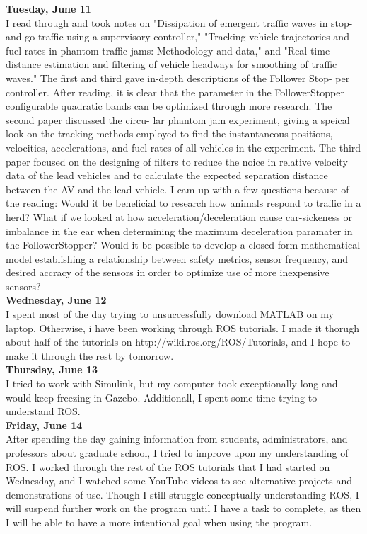 \documentclass[12pt, letterpaper]{article}
\begin{document}
{\bf Tuesday, June 11}\\
I read through and took notes on "Dissipation of emergent traffic waves in stop-and-go traffic using a supervisory controller," "Tracking vehicle trajectories and fuel rates in phantom traffic jams: Methodology and data," and 
"Real-time distance estimation and filtering of vehicle headways for smoothing of traffic waves." The first and third gave in-depth descriptions of the Follower Stop- per controller. After reading, it is clear that the parameter in the FollowerStopper configurable quadratic bands can be optimized through more research. The second paper discussed the circu- lar phantom jam experiment, giving a speical look on the tracking methods employed to find the instantaneous positions, velocities, accelerations, and fuel rates of all vehicles in the experiment. The third paper focused on the designing of filters to reduce the noice in relative velocity data of the lead vehicles and to calculate the expected separation distance between the AV and the lead vehicle. I cam up with a few questions because of the reading: Would it be beneficial to research how animals respond to traffic in a herd? What if we looked at how acceleration/deceleration cause car-sickeness or imbalance in the ear when determining the maximum deceleration paramater in the FollowerStopper? Would it be possible to develop a closed-form mathematical model establishing a relationship between safety metrics, sensor frequency, and desired accracy of the sensors in order to optimize use of more inexpensive sensors? \\
 
{\bf Wednesday, June 12}\\
I spent most of the day trying to unsuccessfully download MATLAB on my laptop. Otherwise, i have been working through ROS tutorials. I made it thorugh about half of the tutorials on http://wiki.ros.org/ROS/Tutorials, and I hope to make it through the rest by tomorrow.\\

{\bf Thursday, June 13}\\
I tried to work with Simulink, but my computer took exceptionally long and would keep freezing in Gazebo. Additionall, I spent some time trying to understand ROS. \\

{\bf Friday, June 14} \\
After spending the day gaining information from students, administrators, and professors about graduate school, I tried to improve upon my understanding of ROS. I worked through the rest of the ROS tutorials that I had started on Wednesday, and I watched some YouTube videos to see alternative projects and demonstrations of use. Though I still struggle conceptually understanding ROS, I will suspend further work on the program until I have a task to complete, as then I will be able to have a more intentional goal when using the program. \\
\end{document}
